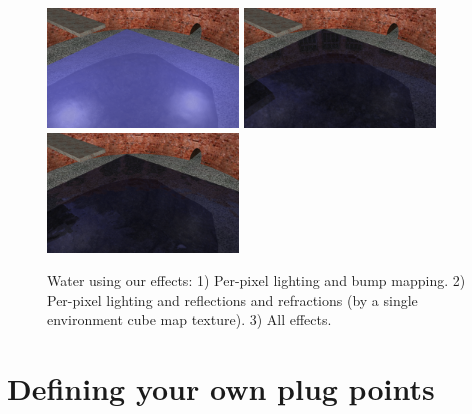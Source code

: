 \documentclass{egpubl}
\begin{document}


\setcounter{figure}{8}
\begin{figure}[b]
  \centering
  \includegraphics[width=2.0in]{water_shaders_1}
  \includegraphics[width=2.0in]{water_shaders_2}
  \includegraphics[width=2.0in]{water_shaders_3}
  \caption{Water using our effects: 1) Per-pixel lighting and bump mapping.
2) Per-pixel lighting and reflections and refractions (by a single environment cube map texture).
3) All effects.}
  \label{fig_water}
\end{figure}
\setcounter{figure}{6}

\section{Defining your own plug points}
\end{document}
